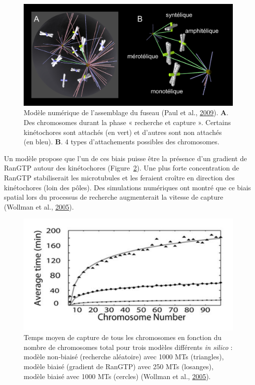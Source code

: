 \documentclass[12pt,a4paper,twoside,openright]{book}
\begin{document}
\begin{figure}[htbp]
\centering
\includegraphics{figures/intro/mogilner.png}
\caption[Modèle numérique de l'assemblage du fuseau]{\label{fig:mogilner}Modèle
numérique de l'assemblage du fuseau (Paul et al.,
\hyperref[ref-Paul2009]{2009}). \textbf{A}. Des chromosomes durant la
phase « recherche et capture ». Certains kinétochores sont attachés (en
vert) et d'autres sont non attachés (en bleu). \textbf{B}. 4 types
d'attachements possibles des chromosomes.}
\end{figure}

Un modèle propose que l'un de ces biais puisse être la présence d'un
gradient de RanGTP autour des kinétochores
(Figure~\ref{fig:assembly_time}). Une plus forte concentration de RanGTP
stabiliserait les microtubules et les feraient croître en direction des
kinétochores (loin des pôles). Des simulations numériques ont montré que
ce biais spatial lors du processus de recherche augmenterait la vitesse
de capture (Wollman et al., \hyperref[ref-Wollman2005]{2005}).

\begin{figure}[htbp]
\centering
\includegraphics{figures/intro/assembly_time.png}
\caption[Temps moyen de capture des chromosomes]{\label{fig:assembly_time}Temps
moyen de capture de tous les chromosomes en fonction du nombre de
chromosomes total pour trois modèles différents \emph{in silico} :
modèle non-biaisé (recherche aléatoire) avec 1000 MTs (triangles),
modèle biaisé (gradient de RanGTP) avec 250 MTs (losanges), modèle
biaisé avec 1000 MTs (cercles) (Wollman et al.,
\hyperref[ref-Wollman2005]{2005}).}
\end{figure}
\end{document}
